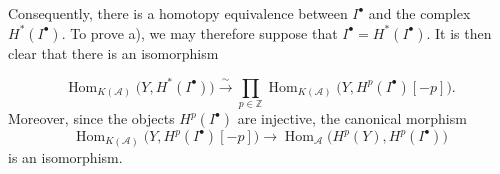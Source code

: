 Consequently, there is a homotopy equivalence between $I^\bullet$ and the
complex $H^*(I^\bullet)$. To prove a), we may therefore suppose that
$I^\bullet=H^*(I^\bullet)$. It is then clear that there is an isomorphism

\[
\operatorname{Hom}_{K(\mathcal A)}\bigl(Y,H^*(I^\bullet)\bigr)
\xrightarrow{\sim}
\prod_{p\in\mathbb Z}
\operatorname{Hom}_{K(\mathcal A)}
\bigl(Y,H^p(I^\bullet)[-p]\bigr).
\]
Moreover, since the objects $H^p(I^\bullet)$ are injective, the canonical
morphism
\[
\operatorname{Hom}_{K(\mathcal A)}
\bigl(Y,H^p(I^\bullet)[-p]\bigr)
\longrightarrow
\operatorname{Hom}_{\mathcal A}\bigl(H^p(Y),H^p(I^\bullet)\bigr)
\]
is an isomorphism.
\endgroup
